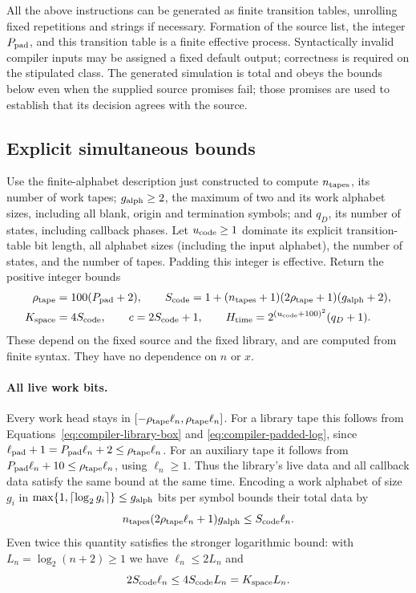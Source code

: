 All the above instructions can be generated as finite transition tables,
unrolling fixed repetitions and strings if necessary.  Formation of the
source list, the integer ${P_{\rm pad}}$, and this transition table is a finite
effective process.  Syntactically invalid compiler inputs may be assigned
a fixed default output; correctness is required on the stipulated class.
The generated simulation is total and obeys the bounds below even when
the supplied source promises fail; those promises are used to establish
that its decision agrees with the source.

\subsection{Explicit simultaneous bounds}
\label{subsec:compiler-bounds}

Use the finite-alphabet description just constructed to compute ${n_{\rm tapes}}$, its
number of work tapes; ${g_{\rm alph}}\ge2$, the maximum of two and its work alphabet
sizes, including all blank, origin and termination symbols; and $q_D$,
its number of states, including callback phases.  Let ${u_{\rm code}}\ge1$ dominate
its explicit transition-table bit length, all alphabet sizes (including
the input alphabet), the number of states, and the number of tapes.
Padding this integer is effective.  Return the positive integer bounds
\begin{equation}\label{eq:compiler-output-bounds}
 \begin{split}
 \rho_{\rm tape}&=100({P_{\rm pad}}+2),\qquad
 {S_{\rm code}}=1+({n_{\rm tapes}}+1)(2\rho_{\rm tape}+1)({g_{\rm alph}}+2),\\
 {K_{\rm space}}&=4{S_{\rm code}},\qquad c=2{S_{\rm code}}+1,\qquad
 {H_{\rm time}}=2^{({u_{\rm code}}+100)^2}(q_D+1).
 \end{split}
\end{equation}
These depend on the fixed source and the fixed library, and are computed
from finite syntax.  They have no dependence on $n$ or $x$.

\paragraph{All live work bits.}
Every work head stays in
$[-\rho_{\rm tape} \ell_n,\rho_{\rm tape} \ell_n]$.  For a library tape this follows from
Equations~\eqref{eq:compiler-library-box} and
\eqref{eq:compiler-padded-log}, since
$\ell_{\mathrm{pad}}+1=P_{\rm pad}\ell_n+2\le\rho_{\rm tape} \ell_n$.
For an auxiliary tape it follows from
$P_{\rm pad}\ell_n+10\le\rho_{\rm tape} \ell_n$, using $\ell_n\ge1$.
Thus the library's live data and all callback data satisfy the same
bound at the same time.  Encoding a work alphabet of size $g_i$ in
$\max\{1,\lceil\log_2 g_i\rceil\}\le {g_{\rm alph}}$ bits per symbol bounds
their total data by
\begin{equation}\label{eq:compiler-space-bound}
 {n_{\rm tapes}}(2\rho_{\rm tape} \ell_n+1){g_{\rm alph}}\le S_{\rm code}\ell_n.
\end{equation}
Even twice this quantity satisfies the stronger logarithmic bound: with
$L_n=\log_2(n+2)\ge1$ we have $\ell_n\le2L_n$ and
\[
 2S_{\rm code}\ell_n\le4S_{\rm code}L_n={K_{\rm space}} L_n.
\]

